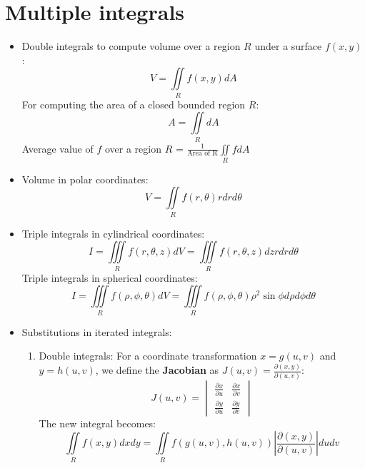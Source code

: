 \documentclass[a4paper]{article}
\begin{document}
\section{Multiple integrals}
\begin{itemize}
    \item Double integrals to compute volume over a region $R$ under a surface $f(x,y)$:
    \begin{equation*}
        V = \iint\limits_Rf(x,y)dA
    \end{equation*}
    For computing the area of a closed bounded region $R$:
    \begin{equation*}
        A = \iint\limits_RdA
    \end{equation*}
    Average value of $f$ over a region $R$ = $\displaystyle\frac{1}{\text{Area of R}}\iint\limits_R fdA$
    
    \item Volume in polar coordinates:
    \begin{equation*}
        V = \iint\limits_R f(r,\theta)rdrd\theta
    \end{equation*}
    
    \item Triple integrals in cylindrical coordinates:
    \begin{equation*}
        I = \iiint\limits_R f(r,\theta,z)dV = \iiint\limits_R f(r,\theta,z)dzrdrd\theta
    \end{equation*}
    Triple integrals in spherical coordinates:
    \begin{equation*}
        I = \iiint\limits_R f(\rho,\phi,\theta)dV = \iiint\limits_R f(\rho,\phi,\theta)\rho^2\sin{\phi}d\rho d\phi d\theta 
    \end{equation*}
    
    \item Substitutions in iterated integrals:
    \begin{enumerate}
        \item Double integrals: For a coordinate transformation $x=g(u,v)$ and $y=h(u,v)$, we define the \textbf{Jacobian} as $J(u,v)=\frac{\partial(x,y)}{\partial(u,v)}$:
        \begin{equation*}
        J(u,v)=
            \begin{vmatrix}
            \frac{\partial x}{\partial u} & \frac{\partial x}{\partial v}\\
            \frac{\partial y}{\partial u} & \frac{\partial y}{\partial v}
        \end{vmatrix} 
        \end{equation*}
        The new integral becomes:
        \begin{equation*}
            \iint\limits_Rf(x,y)dxdy = \iint\limits_Rf(g(u,v),h(u,v))\left|\frac{\partial(x,y)}{\partial(u,v)}\right|dudv
        \end{equation*}
        

\end{enumerate}
\end{itemize}
\end{document}
